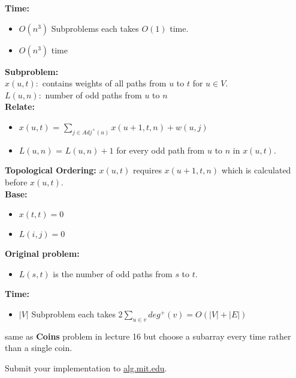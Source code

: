 \documentclass[12pt,twoside]{article}
\begin{document}
\begin{problems}
  \textbf{Time:}
  \begin{itemize}
    \item $O(n^3)$ Subproblems each takes $O(1)$ time.
    \item $O(n^3)$ time 
  \end{itemize}

\newpage
\problem  %
\textbf{Subproblem:} \\
$x(u, t): $ contains weights of all paths from $u$ to $t$ for $u \in V$. \\
$L(u, n): $ number of odd paths from $u$ to $n$ \\
\textbf{Relate:} 
\begin{itemize}
  \item $x(u, t)$ = $\sum_{j \in Adj^+(u)} x(u + 1, t, n) + w(u, j)$
  \item $L(u, n)$ = $L(u, n) + 1$ for every odd path from $u$ to $n$ in $x(u, t)$.
\end{itemize}

\textbf{Topological Ordering:} $x(u, t)$ requires $x(u + 1, t, n)$ which is calculated before $x(u, t)$. \\

  \textbf{Base:}
  \begin{itemize}
    \item $x(t, t) = 0$
    \item $L(i, j) = 0$
  \end{itemize}

  \textbf{Original problem:}
  \begin{itemize}
    \item $L(s, t)$ is the number of odd paths from $s$ to $t$.
  \end{itemize}

  \textbf{Time:}
  \begin{itemize}
    \item $|V|$ Subproblem each takes $2\sum_{u \in v} deg^+(v) = O(|V| + |E|)$
  \end{itemize}
\newpage
\problem  %
same as \textbf{Coins} problem in lecture 16 but choose a subarray every time rather than a single coin.

\newpage
\problem  %

\begin{problemparts}
\problempart %
\problempart Submit your implementation to {\small\url{alg.mit.edu}}.
\end{problemparts}

\end{problems}
\end{document}
